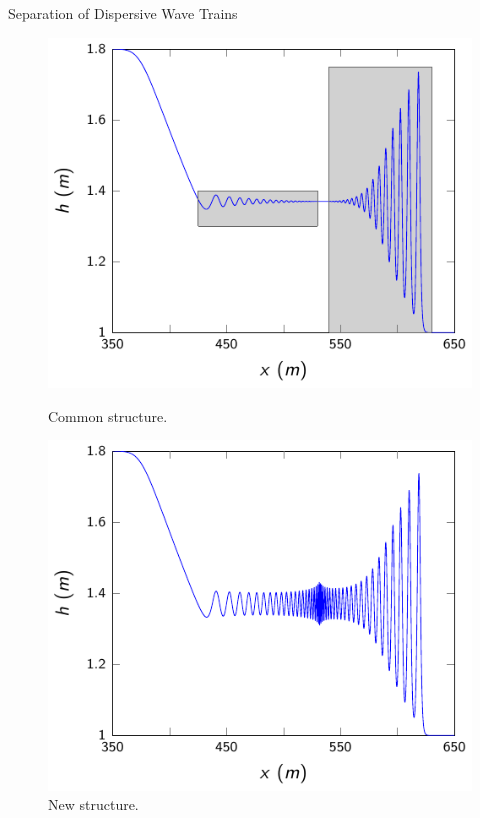 \documentclass[pdf]{beamer}
\begin{document}

\begin{frame}{Separation of Dispersive Wave Trains}
	\begin{figure}
		\hspace*{-0.9cm}%
		\begin{minipage}{.5\textwidth}
			\includegraphics[width=1.2\linewidth]{./Pictures/DSW/DSWtails.pdf}
			\caption{Common structure.}
		\end{minipage}%
		\hspace*{0.9cm}%
		\begin{minipage}{.5\textwidth}
			\includegraphics[width=1.2\linewidth]{./Pictures/DSW/DSWtails1.pdf}
			\caption{New structure.}
		\end{minipage}
	\end{figure}
\end{frame}
\end{document}
